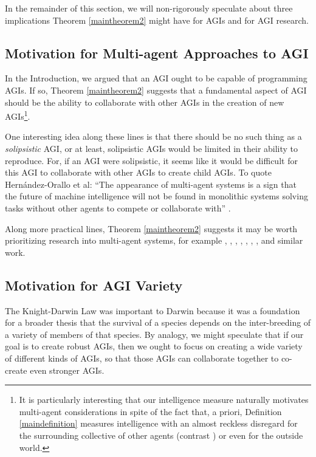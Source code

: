\documentclass[runningheads]{llncs}
\begin{document}
In the remainder of this section, we will non-rigorously speculate about three implications
Theorem \ref{maintheorem2} might have for AGIs and for AGI research.


\subsection{Motivation for Multi-agent Approaches to AGI}

In the Introduction, we argued that an AGI ought to be
capable of programming AGIs. If so, Theorem \ref{maintheorem2} suggests
that a fundamental aspect of AGI should be the ability to collaborate with other
AGIs in the creation of new AGIs\footnote{It is particularly interesting that our
intelligence measure naturally motivates multi-agent considerations in spite of
the fact that, a priori, Definition \ref{maindefinition} measures intelligence
with an almost reckless disregard for the surrounding collective of other agents
(contrast \cite{hernandez2011more}) or even for the outside world.}.

One interesting idea along these lines is that there should be no
such thing as a \emph{solipsistic} AGI, or at least, solipsistic AGIs would be
limited in their ability to reproduce.
For, if an AGI were solipsistic, it
seems like it would be difficult for this AGI to collaborate with other AGIs
to create child AGIs.
To quote Hern{\'a}ndez-Orallo et al: ``The appearance of multi-agent systems is a sign that
the future of machine intelligence will not be found in monolithic systems
solving tasks without other agents to compete or collaborate with''
\cite{hernandez2011more}.

Along more practical lines, Theorem \ref{maintheorem2} suggests it may be worth
prioritizing research into multi-agent systems, for example
\cite{castelfranchi1998modelling}, \cite{hernandez2011more},
\cite{hibbard2011societies}, \cite{lazaridou2018emergence},
\cite{thorisson2004constructionist}, \cite{potyka2016group},
\cite{kolonin2018reputation},
and similar work.

\subsection{Motivation for AGI Variety}

The Knight-Darwin Law was important to
Darwin because it was a foundation for a broader thesis that the survival of a
species depends on the inter-breeding of a variety of members of that species.
By analogy, we might speculate that if our goal is to create robust AGIs, then
we ought to focus on creating a wide variety of different kinds of AGIs, so that
those AGIs can collaborate together to co-create even stronger AGIs.
\end{document}
